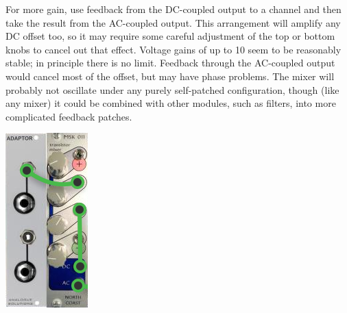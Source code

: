 For more gain, use feedback from the DC-coupled output to a channel and
then take the result from the AC-coupled output.  This arrangement will
amplify any DC offset too, so it may require some careful adjustment of the
top or bottom knobs to cancel out that effect.  Voltage gains of up to 10
seem to be reasonably stable; in principle there is no limit.  Feedback
through the AC-coupled output would cancel most of the offset, but may have
phase problems.  The mixer will probably not oscillate under any purely
self-patched configuration, though (like any mixer) it could be combined
with other modules, such as filters, into more complicated feedback patches.

\nopagebreak\noindent
{\hspace*{\fill}\includegraphics[scale=0.6]{patch5.png}\hspace*{\fill}\par} 
